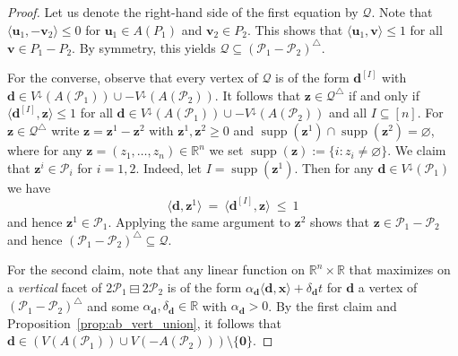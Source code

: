 \documentclass[11pt]{amsart}
\theoremstyle{definition}
\begin{document}
\begin{proof}
    Let us denote the right-hand side of the first equation by ${\mathcal{Q}}$. Note
    that ${\langle{{{\mathbf{u}}_1,-{\mathbf{v}}_2}}\rangle} \le 0$ for ${\mathbf{u}}_1 \in {A({{P_1}})}$ and ${\mathbf{v}}_2 \in
    P_2$. This shows that ${\langle{{{\mathbf{u}}_1,{\mathbf{v}}}}\rangle} \le 1$ for all ${\mathbf{v}} \in P_1 - P_2$.
    By symmetry, this yields ${\mathcal{Q}} \subseteq ({\mathcal{P}}_1 - {\mathcal{P}}_2)^{\triangle}$.

    For the converse, observe that every vertex of ${\mathcal{Q}}$ is of the form ${{{\mathbf{d}}}^{[{I}]}}$ with ${\mathbf{d}}\in{V^\downarrow}({A({{{\mathcal{P}}_1}})})
    \cup -{V^\downarrow}({A({{{\mathcal{P}}_2}})})$. It follows that ${\mathbf{z}} \in {\mathcal{Q}}^{\triangle}$ if and only if $
    {\langle{{{{{\mathbf{d}}}^{[{I}]}}, {\mathbf{z}}}}\rangle} \le 1$ for all $ {\mathbf{d}} \in {V^\downarrow}({A({{{\mathcal{P}}_1}})})
    \cup -{V^\downarrow}({A({{{\mathcal{P}}_2}})})$ and  all $I \subseteq [n]$.  For ${\mathbf{z}} \in
    {\mathcal{Q}}^{\triangle}$ write ${\mathbf{z}} = {\mathbf{z}}^1 - {\mathbf{z}}^2$ with ${\mathbf{z}}^1,{\mathbf{z}}^2 \ge 0$ and
    $\operatorname{supp}({\mathbf{z}}^1) \cap \operatorname{supp}({\mathbf{z}}^2) = {\varnothing}$, where for any ${\mathbf{z}}=(z_1,\dots,z_n)\in{\mathbb{R}}^n$ we set $\operatorname{supp}({\mathbf{z}}):=\{i:z_i\neq{\varnothing}\}$. We claim that ${\mathbf{z}}^i \in {\mathcal{P}}_i$
    for $i=1,2$. Indeed, let $I = \operatorname{supp}({\mathbf{z}}^1)$. Then for any ${\mathbf{d}} \in
    {V^\downarrow}({\mathcal{P}}_1)$ we have
    \[
        {\langle{{{\mathbf{d}},{\mathbf{z}}^1}}\rangle} \ = \ {\langle{{{{{\mathbf{d}}}^{[{I}]}},{\mathbf{z}}}}\rangle} \ \le \ 1
    \]
    and hence ${\mathbf{z}}^1 \in {\mathcal{P}}_1$. Applying the same argument to ${\mathbf{z}}^2$ shows
    that ${\mathbf{z}} \in {\mathcal{P}}_1 - {\mathcal{P}}_2$ and hence $({\mathcal{P}}_1 - {\mathcal{P}}_2)^{\triangle} \subseteq
    {\mathcal{Q}}$.

    For the second claim, note that any linear function on ${\mathbb{R}}^n \times {\mathbb{R}}$
    that maximizes on a \emph{vertical} facet of ${{{2{\mathcal{P}}_1} \boxminus {2{\mathcal{P}}_2}}}$ is
    of the form $\alpha_{\mathbf{d}} {\langle{{{\mathbf{d}},{\mathbf{x}}}}\rangle} + \delta_{\mathbf{d}} t$ for ${\mathbf{d}}$ a vertex of
    $({\mathcal{P}}_1 - {\mathcal{P}}_2)^{\triangle}$ and some $\alpha_{\mathbf{d}}, \delta_{\mathbf{d}} \in {\mathbb{R}}$ with
    $\alpha_{\mathbf{d}} > 0$.  By the first claim and
    Proposition~\ref{prop:ab_vert_union}, it follows that ${\mathbf{d}} \in
    (V({A({{{\mathcal{P}}_1}})}) \cup V(-{A({{{\mathcal{P}}_2}})})) \setminus \{{\mathbf{0}}\}$. 


\end{proof}
\end{document}
